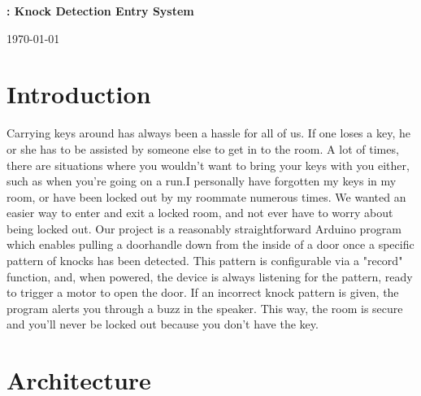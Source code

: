 \documentclass[11pt]{article}			%
\author{Matt Nichols}
\date{\today}
\begin{document}
\centerline{\bf \LARGE\thishw: Knock Detection Entry System}
\centerline{\today}

\section{Introduction}
Carrying keys around has always been a hassle for all of us. If one loses a key, he or she has to be assisted by someone else to get in to the room. A lot of times, there are situations where you wouldn't want to bring your keys with you either, such as when you're going on a run.I personally have forgotten my keys in my room, or have been locked out by my roommate numerous times. We wanted an easier way to enter and exit a locked room, and not ever have to worry about being locked out. 
Our project is a reasonably straightforward Arduino program which enables pulling a doorhandle down from the inside of a door once a specific pattern of knocks has been detected. This pattern is configurable via a "record" function, and, when powered, the device is always listening for the pattern, ready to trigger a motor to open the door. If an incorrect knock pattern is given, the program alerts you through a buzz in the speaker. This way, the room is secure and you'll never be locked out because you don't have the key.

\section{Architecture}
\end{document}

